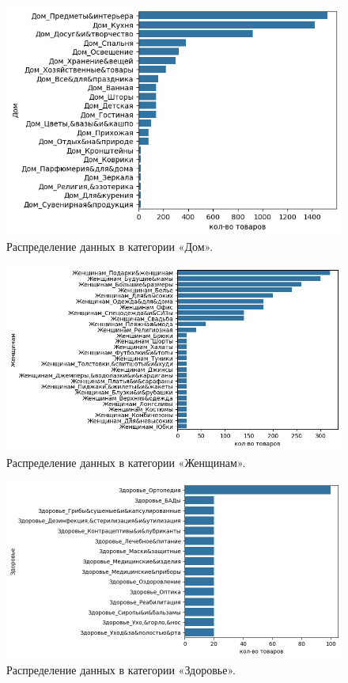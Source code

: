 \documentclass[a4paper,12pt]{extarticle}
\begin{document}
\begin{figure}[hbtp]
	\centering
	\includegraphics[scale=0.8]{приложения/amount_of_category_Дом.png}
	\caption{Распределение данных в категории «Дом».}
	\label{fig:amount_of_category_Автотовары}
\end{figure}

\begin{figure}[hbtp]
	\centering
	\includegraphics[scale=0.8]{приложения/amount_of_category_Женщинам.png}
	\caption{Распределение данных в категории «Женщинам».}
	\label{fig:amount_of_category_Женщинам}
\end{figure}

\begin{figure}[hbtp]
	\centering
	\includegraphics[scale=0.8]{приложения/amount_of_category_Здоровье.png}
	\caption{Распределение данных в категории «Здоровье».}
	\label{fig:amount_of_category_Здоровье}
\end{figure}
\end{document}
